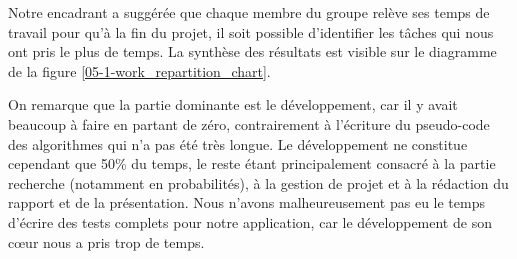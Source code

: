 Notre encadrant a suggérée que chaque membre du groupe relève ses temps de travail pour qu'à la fin du projet, il soit possible d'identifier les tâches qui nous ont pris le plus de temps. La synthèse des résultats est visible sur le diagramme de la figure \ref{05-1-work_repartition_chart}.

On remarque que la partie dominante est le développement, car il y avait beaucoup à faire en partant de zéro, contrairement à l'écriture du pseudo-code des algorithmes qui n'a pas été très longue. Le développement ne constitue cependant que 50\% du temps, le reste étant principalement consacré à la partie recherche (notamment en probabilités), à la gestion de projet et à la rédaction du rapport et de la présentation.
Nous n'avons malheureusement pas eu le temps d'écrire des tests complets pour notre application, car le développement de son cœur nous a pris trop de temps.


